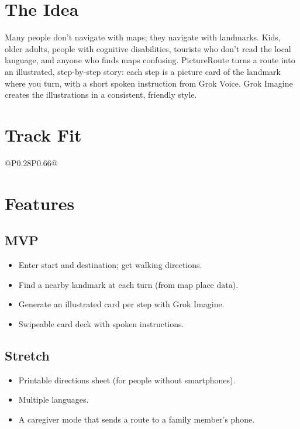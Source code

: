 \documentclass[11pt]{article}
\begin{document}

\section{The Idea}
Many people don't navigate with maps; they navigate with landmarks. Kids, older
adults, people with cognitive disabilities, tourists who don't read the local
language, and anyone who finds maps confusing. PictureRoute turns a route into an
illustrated, step-by-step story: each step is a picture card of the landmark where
you turn, with a short spoken instruction from Grok Voice. Grok Imagine creates
the illustrations in a consistent, friendly style.

\section{Track Fit}
\begin{tabular}{@{}P{0.28\textwidth}P{0.66\textwidth}@{}}
\toprule
{}
\bottomrule
\end{tabular}

\section{Features}
\subsection{MVP}
\begin{itemize}
  \item Enter start and destination; get walking directions.
  \item Find a nearby landmark at each turn (from map place data).
  \item Generate an illustrated card per step with Grok Imagine.
  \item Swipeable card deck with spoken instructions.
\end{itemize}
\subsection{Stretch}
\begin{itemize}
  \item Printable directions sheet (for people without smartphones).
  \item Multiple languages.
  \item A caregiver mode that sends a route to a family member's phone.
\end{itemize}
\end{document}
